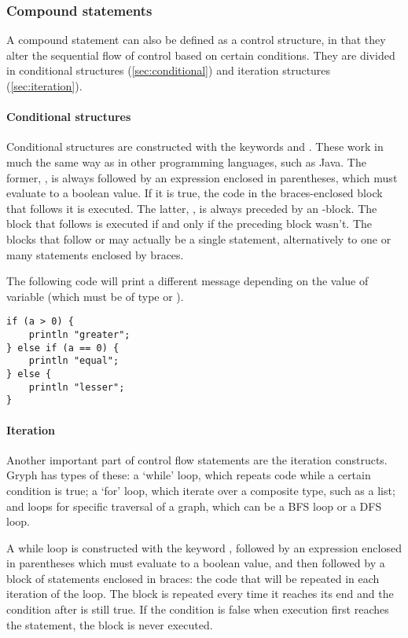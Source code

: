 \subsubsection{Compound statements}
\label{sec:compound-stmts}
A compound statement can also be defined as a control structure, in that they alter the sequential flow of control based on certain conditions. They are divided in conditional structures (\autoref{sec:conditional}) and iteration structures (\autoref{sec:iteration}).

\paragraph{Conditional structures}
\label{sec:conditional}
Conditional structures are constructed with the keywords  and . These work in much the same way as in other programming languages, such as Java. The former, , is always followed by an expression enclosed in parentheses, which must evaluate to a boolean value. If it is true, the code in the braces-enclosed block that follows it is executed. The latter, , is always preceded by an -block. The block that follows  is executed if and only if the preceding block wasn't. The blocks that follow  or  may actually be a single statement, alternatively to one or many statements enclosed by braces.

The following code will print a different message depending on the value of variable  (which must be of type  or ).
\begin{lstlisting}[language=Gryph]
if (a > 0) {
	println "greater";
} else if (a == 0) {
	println "equal";
} else {
	println "lesser";
}
\end{lstlisting}

\paragraph{Iteration}
\label{sec:iteration}
Another important part of control flow statements are the iteration constructs. Gryph has types of these: a `while' loop, which repeats code while a certain condition is true; a `for' loop, which iterate over a composite type, such as a list; and loops for specific traversal of a graph, which can be a BFS loop or a DFS loop.

A while loop is constructed with the keyword , followed by an expression enclosed in parentheses which must evaluate to a boolean value, and then followed by a block of statements enclosed in braces: the code that will be repeated in each iteration of the loop. The block is repeated every time it reaches its end and the condition after  is still true. If the condition is false when execution first reaches the  statement, the block is never executed.

